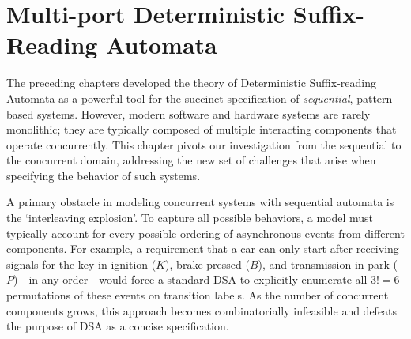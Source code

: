 \chapter{Multi-port Deterministic Suffix-Reading Automata}
\label{sec:multiport}

The preceding chapters developed the theory of Deterministic Suffix-reading Automata as a powerful tool for the succinct specification of \emph{sequential}, pattern-based systems. However, modern software and hardware systems are rarely monolithic; they are typically composed of multiple interacting components that operate concurrently. This chapter pivots our investigation from the sequential to the concurrent domain, addressing the new set of challenges that arise when specifying the behavior of such systems.

A primary obstacle in modeling concurrent systems with sequential automata is the `interleaving explosion'. To capture all possible behaviors, a model must typically account for every possible ordering of asynchronous events from different components. For example, a requirement that a car can only start after receiving signals for the key in ignition ($K$), brake pressed ($B$), and transmission in park ($P$)—in any order—would force a standard DSA to explicitly enumerate all $3! = 6$ permutations of these events on transition labels. As the number of concurrent components grows, this approach becomes combinatorially infeasible and defeats the purpose of DSA as a concise specification.





